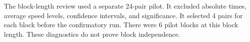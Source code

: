 The block-length review used a separate 24-pair pilot. It excluded absolute times, average speed levels, confidence intervals, and significance. It selected 4 pairs for each block before the confirmatory run. There were 6 pilot blocks at this block length. These diagnostics do not prove block independence.


